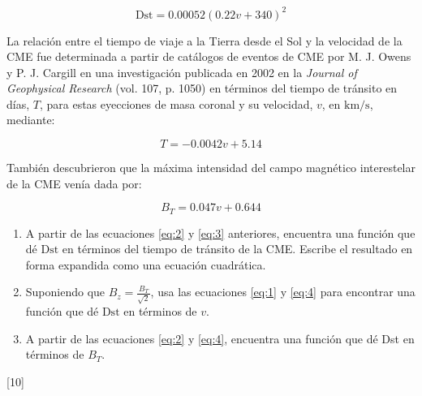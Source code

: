 \documentclass[a4paper]{article}
\newcommand{\km}{\text{km}}
\newcommand{\s}{\text{s}}
\newcounter{problema}
\begin{document}
\begin{problema}
\begin{equation}
\text{Dst} = 0.00052(0.22v + 340)^2
\label{eq:2}
\end{equation}

La relación entre el tiempo de viaje a la Tierra desde el Sol y la velocidad de la CME fue determinada a partir de catálogos de eventos de CME por M. J. Owens y P. J. Cargill en una investigación publicada en 2002 en la \textit{Journal of Geophysical Research} (vol. 107, p. 1050) en términos del tiempo de tránsito en días, $T$, para estas eyecciones de masa coronal y su velocidad, $v$, en $\km/\s$, mediante:

\begin{equation}
T = -0.0042v + 5.14
\label{eq:3}
\end{equation}

También descubrieron que la máxima intensidad del campo magnético interestelar de la CME venía dada por:

\begin{equation}
B_T = 0.047v + 0.644
\label{eq:4}
\end{equation}

\vspace{5mm}

\begin{enumerate}
	\item A partir de las ecuaciones \eqref{eq:2} y \eqref{eq:3} anteriores, encuentra una función que dé $\text{Dst}$ en términos del tiempo de tránsito de la CME. Escribe el resultado en forma expandida como una ecuación cuadrática.

	\item Suponiendo que $B_z = \frac{B_T}{\sqrt{2}}$, usa las ecuaciones \eqref{eq:1} y \eqref{eq:4} para encontrar una función que dé $\text{Dst}$ en términos de $v$.

	\item A partir de las ecuaciones \eqref{eq:2} y \eqref{eq:4}, encuentra una función que dé Dst en términos de $B_T$.
\end{enumerate}

\end{problema}
[10] \cite{NASA_SpaceMathIII}
\end{document}

